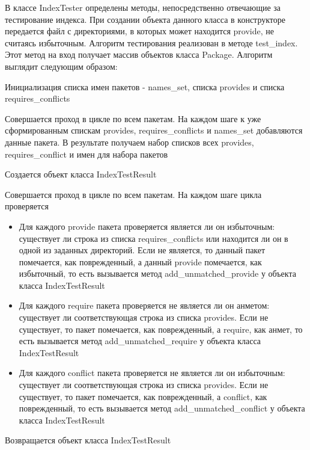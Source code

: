В классе IndexTester определены методы, непосредственно отвечающие за тестирование
индекса. При создании объекта данного класса в конструкторе передается файл с директориями,
в которых может находится provide, не считаясь избыточным. 
Алгоритм тестирования реализован в методе test_index. Этот метод на вход
получает массив объектов класса Package. Алгоритм выглядит следующим образом:
\begin{enumerate}
\item{Инициализация списка имен пакетов - names_set, списка provides и %
списка requires_conflicts}
\item{Совершается проход в цикле по всем пакетам. На каждом шаге 
к уже сформированным спискам provides, requires_conflicts и names_set 
добавляются данные пакета. В результате получаем набор списков всех provides, 
requires_conflict и имен для набора пакетов}
\item{Создается объект класса IndexTestResult}
\item{Совершается проход в цикле по всем пакетам. На каждом шаге цикла проверяется
\begin{itemize}
\item{Для каждого provide пакета проверяется является ли он избыточным: существует ли
строка из списка requires_conflicts или находится ли он в одной из заданных директорий.
Если не является, то данный пакет помечается, как поврежденный, а данный provide помечается,
как избыточный, то есть вызывается метод add_unmatched_provide у объекта класса IndexTestResult}
\item{Для каждого require пакета проверяется не является ли он анметом: существует ли
соответствующая строка из списка provides. Если не существует, то пакет помечается, как 
поврежденный, а require, как анмет, то есть вызывается метод add_unmatched_require
у объекта класса IndexTestResult}
\item{Для каждого conflict пакета проверяется не является ли он избыточным: существует ли
соответствующая строка из списка provides. Если не существует, то пакет помечается, как 
поврежденный, а conflict, как поврежденный, то есть вызывается метод add_unmatched_conflict
у объекта класса IndexTestResult}
\end{itemize}
\item{Возвращается объект класса IndexTestResult}

}
\end{enumerate}
